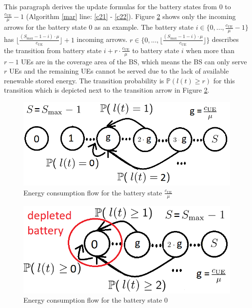 This paragraph derives the update formulas for the battery states from $0$ to $\frac{c_{\mathrm{UE}}}{\mu}-1$ (Algorithm \ref{mar} line: \ref{c21} - \ref{c22}). Figure \ref{fig:consum2} shows only the incoming arrows for the battery state $0$ as an example. The battery state $i \in \{0,...,\frac{c_{\mathrm{UE}}}{\mu}-1\}$ has $\Big\lfloor \frac{(S_{\max}-1-i)\cdot\mu}{c_{\mathrm{UE}}} \Big\rfloor + 1 $ incoming arrows. $r \in \big\{0,...,\Big\lfloor \frac{(S_{\max}-1-i)\cdot\mu}{c_{\mathrm{UE}}} \Big\rfloor\big\}$ describes the transition from battery state $i+r \cdot \frac{c_{\mathrm{UE}}}{\mu}$ to battery state $i$ when more than $r-1$ UEs are in the coverage area of the BS, which means the BS can only serve $r$ UEs and the remaining UEs cannot be served due to the lack of available renewable stored energy. The transition probability is $\mathbb{P}(l(t)\geq r) $ for this transition which is depicted next to the transition arrow in Figure \ref{fig:consum2}.



\begin{figure}[H]
	\centering
		\includegraphics[scale=0.6]{pictures/33}
	\caption{Energy consumption flow for the battery state $\frac{c_{\mathrm{UE}}}{\mu}$ \label{fig:consum1}}
\end{figure}


\begin{figure}[H]
	\centering
		\includegraphics[scale=0.6]{pictures/rr}
	\caption{Energy consumption flow for the battery state $0$ \label{fig:consum2}}
\end{figure}


